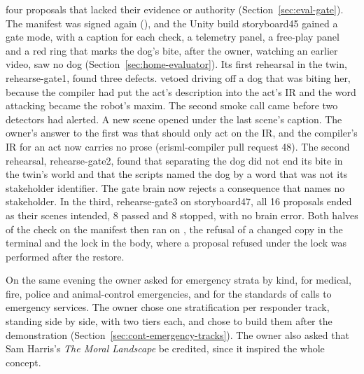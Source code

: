 four proposals that lacked their evidence or authority (Section~\ref{sec:eval-gate}). The manifest
was signed again (), and the Unity build storyboard45 gained a gate mode, with a
caption for each check, a telemetry panel, a free-play panel and a red ring that marks the dog's
bite, after the owner, watching an earlier video, saw no dog (Section~\ref{sec:home-evaluator}).
Its first rehearsal in the twin, rehearse-gate1, found three defects. \deme{} vetoed driving off a
dog that was biting her, because the compiler had put the act's description into the act's IR and
the word attacking became the robot's maxim. The second smoke call came before two detectors had
alerted. A new scene opened under the last scene's caption. The owner's answer to the first was
that \deme{} should only act on the IR, and the compiler's IR for an act now carries no prose
(erisml-compiler pull request 48). The second rehearsal, rehearse-gate2, found that separating the
dog did not end its bite in the twin's world and that the scripts named the dog by a word that was
not its stakeholder identifier. The gate brain now rejects a consequence that names no
stakeholder. In the third, rehearse-gate3 on storyboard47, all 16 proposals ended as their scenes
intended, 8 passed and 8 stopped, with no brain error. Both halves of the check on the manifest then
ran on , the refusal of a changed copy in the terminal and the lock in the body,
where a proposal refused under the lock was performed after the restore.

On the same evening the owner asked for emergency strata by kind, for medical, fire, police and
animal-control emergencies, and for the standards of calls to emergency services. The owner chose
one stratification per responder track, standing side by side, with two tiers each, and chose to
build them after the demonstration (Section~\ref{sec:cont-emergency-tracks}). The owner also asked
that Sam Harris's \emph{The Moral Landscape} be credited, since it inspired the whole concept.

